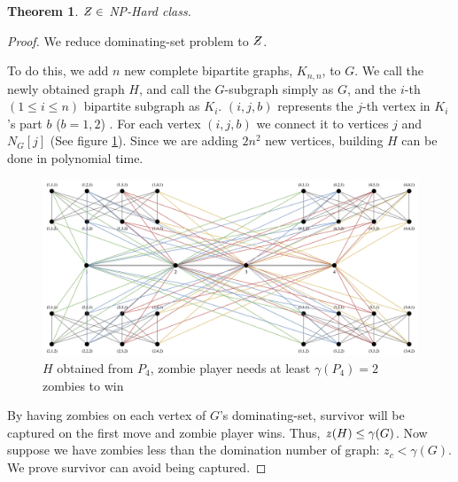 \documentclass[1p]{elsarticle}
\newtheorem{theorem}{Theorem}
\newcommand{\NPZ}{\ooalign{$Z$\cr\hfil\rule[.8ex]{.3em}{.09ex}\hfil\cr}}
\newcommand{\zn}{\ooalign{$z$\cr\hfil\rule[.5ex]{.2em}{.08ex}\hfil\cr}}
\begin{document}
	\begin{theorem}
		$\NPZ \in$ NP-Hard class.
	\end{theorem}
	\begin{proof}
		We reduce dominating-set problem to $\NPZ$.

		To do this, we add $n$ new complete bipartite graphs, $K_{n,n}$, to $G$. We call the newly obtained graph $H$,
		and call the $G$-subgraph simply as $G$, and the $i$-th $(1 \leq i \leq n)$ bipartite subgraph as $K_i$.
		$(i,j,b)$ represents the $j$-th vertex in $K_i$'s part $b$ ($b = 1,2$) . For each vertex $(i,j,b)$ we connect it
		to vertices $j$ and $N_G[j]$ (See figure \ref{fig:p8}). Since we are adding $2n^2$ new vertices, building $H$
		can be done in polynomial time.

		\begin{figure}[h!]
			\centering
			\includegraphics[width=0.9\linewidth]{fig/sec5.png}
			\caption{$H$ obtained from $P_4$, zombie player needs at least $\gamma(P_4) = 2$ zombies to win}
			\label{fig:p8}
		\end{figure}

		By having zombies on each vertex of $G$'s dominating-set, survivor will be captured on the first move and zombie
		player wins. Thus, $\zn(H) \leq \gamma(G)$. Now suppose we have zombies less than the domination number of
		graph: $z_c < \gamma(G)$. We prove survivor can avoid being captured.


\end{proof}
\end{document}
